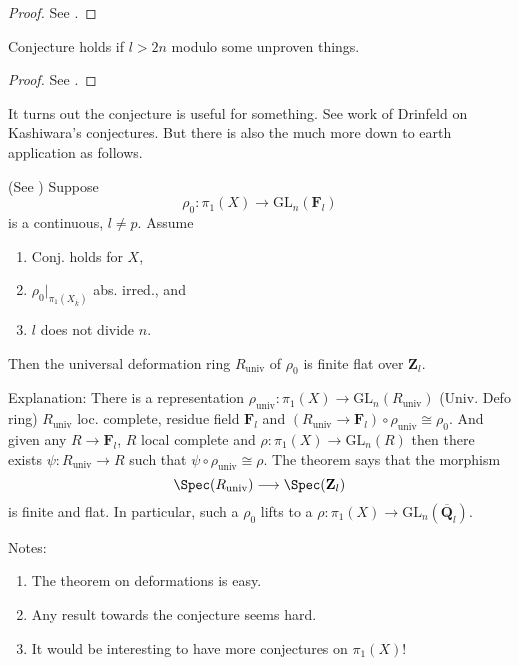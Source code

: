 \begin{proof}
See \cite{dJ-conjecture}.
\end{proof}

\begin{theorem}
\label{theorem-conjecture-l-bigger-2n}
Conjecture holds if $l > 2n$ modulo some unproven things.
\end{theorem}

\begin{proof}
See \cite{Gaitsgory}.
\end{proof}

\noindent
It turns out the conjecture is useful for something.
See work of Drinfeld on Kashiwara's conjectures. But there is also
the much more down to earth application as follows.

\begin{theorem}
\label{theorem-deformation-rings}
(See \cite[Theorem 3.5]{dJ-conjecture})
Suppose
$$
\rho_0: \pi_1(X)\to \text{GL}_n(\mathbf{F}_l)
$$
is a continuous, $l\neq p$. Assume
\begin{enumerate}
\item Conj. holds for $X$,
\item $\rho_0 |_{\pi_1(X_{\overline{k}})}$ abs. irred., and
\item $l$ does not divide $n$.
\end{enumerate}
Then the universal deformation ring $R_{\text{univ}}$ of $\rho_0$ is
finite flat over $\mathbf{Z}_l$.
\end{theorem}

\noindent
Explanation: There is a representation $\rho_{\text{univ}}:
\pi_1(X)\to \text{GL}_n(R_{\text{univ}})$ (Univ. Defo ring)
$R_{\text{univ}}$ loc.
complete, residue field $\mathbf{F}_l$ and $(R_{\text{univ}}\to
\mathbf{F}_l)\circ\rho_{\text{univ}}\cong\rho_0$.
And given any $R\to \mathbf{F}_l$, $R$ local complete and
$\rho : \pi_1(X)\to \text{GL}_n(R)$ then there exists
$\psi : R_{\text{univ}}\to R$ such that
$\psi\circ\rho_{\text{univ}}\cong \rho$. The theorem says that the morphism
$$
\Spec(R_{\text{univ}})
\longrightarrow
\Spec(\mathbf{Z}_l)
$$
is finite and flat. In particular, such a $\rho_0$
lifts to a $\rho : \pi_1(X) \to \text{GL}_n(\overline{\mathbf{Q}}_l)$.

\medskip\noindent
Notes:
\begin{enumerate}
\item The theorem on deformations is easy.
\item Any result towards the conjecture seems hard.
\item It would be interesting to have more conjectures on $\pi_1(X)$!
\end{enumerate}




